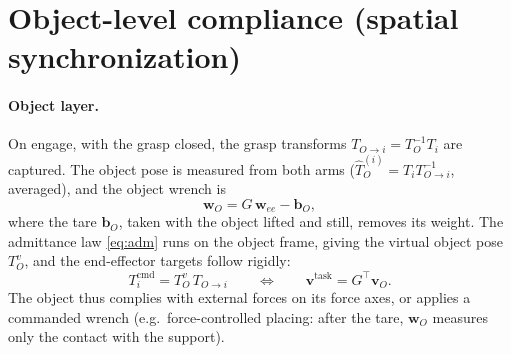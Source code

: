 \documentclass[11pt,a4paper]{article}
\newcommand{\vect}[1]{\boldsymbol{#1}}
\begin{document}
\section{Object-level compliance (spatial synchronization)}\label{sec:spatial}

\paragraph{Object layer.} On engage, with the grasp closed, the grasp transforms $T_{O\to i}=T_O^{-1}T_i$ are captured.
The object pose is measured from both arms ($\hat T_O^{(i)}=T_iT_{O\to i}^{-1}$, averaged), and the object wrench is
\begin{equation}
  \vect w_O=G\,\vect w_{ee}-\vect b_O,
\end{equation}
where the tare $\vect b_O$, taken with the object lifted and still, removes its weight. The admittance law
\eqref{eq:adm} runs on the object frame, giving the virtual object pose $T_O^v$, and the end-effector targets follow
rigidly:
\begin{equation}
  T_i^{\mathrm{cmd}}=T_O^v\,T_{O\to i}\qquad\Longleftrightarrow\qquad \vect v^{\mathrm{task}}=G^\top\vect v_O .
\end{equation}
The object thus complies with external forces on its force axes, or applies a commanded wrench (e.g.\
force-controlled placing: after the tare, $\vect w_O$ measures only the contact with the support).
\end{document}
